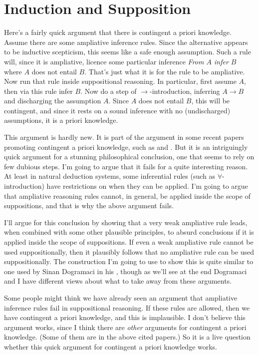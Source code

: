 \chapter{Induction and Supposition}


\noindent Here's a fairly quick argument that there is contingent a priori knowledge. Assume there are some ampliative inference rules. Since the alternative appears to be inductive scepticism, this seems like a safe enough assumption. Such a rule will, since it is ampliative, licence some particular inference \textit{From $A$ infer $B$} where $A$ does not entail $B$. That's just what it is for the rule to be ampliative. Now run that rule inside suppositional reasoning. In particular, first assume $A$, then via this rule infer $B$. Now do a step of $\rightarrow$-introduction, inferring $A \rightarrow B$ and discharging the assumption $A$. Since $A$ does not entail $B$, this will be contingent, and since it rests on a sound inference with no (undischarged) assumptions, it is a priori knowledge. 

This argument is hardly new. It is part of the argument in some recent papers promoting contingent a priori knowledge, such as \citet{Hawthorne2002} and \citet{WeathersonSRE}. But it is an intriguingly quick argument for a stunning philosophical conclusion, one that seems to rely on few dubious steps. I'm going to argue that it fails for a quite interesting reason. At least in natural deduction systems, some inferential rules (such as $\forall$-introduction) have restrictions on when they can be applied. I'm going to argue that ampliative reasoning rules cannot, in general, be applied inside the scope of suppositions, and that is why the above argument fails.

I'll argue for this conclusion by showing that a very weak ampliative rule leads, when combined with some other plausible principles, to absurd conclusions if it is applied inside the scope of suppositions. If even a weak ampliative rule cannot be used suppositionally, then it plausibly follows that no ampliative rule can be used suppositionally. The construction I'm going to use to show this is quite similar to one used by Sinan Dogramaci in his \citet{Dogramaci2010}, though as we'll see at the end Dogramaci and I have different views about what to take away from these arguments.

Some people might think we have already seen an argument that ampliative inference rules fail in suppositional reasoning. If these rules are allowed, then we have contingent a priori knowledge, and this is implausible. I don't believe this argument works, since I think there are \textit{other} arguments for contingent a priori knowledge. (Some of them are in the above cited papers.) So it is a live question whether this quick argument for contingent a priori knowledge works.

